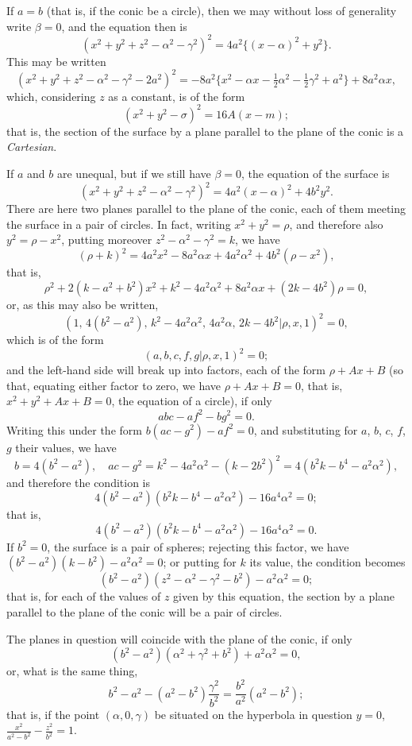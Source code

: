 \documentclass[11pt,a4paper]{article}
\theoremstyle{plain}
\begin{document}
If $a = b$ (that is, if the conic be a circle), then we may without loss of generality write $\beta = 0$, and the equation then is
\[
(x^2 + y^2 + z^2 - \alpha^2 - \gamma^2)^2 = 4a^2\{(x - \alpha)^2 + y^2\}.
\]
This may be written
\[
(x^2 + y^2 + z^2 - \alpha^2 - \gamma^2 - 2a^2)^2 = -8a^2\{x^2 - \alpha x - \tfrac12\alpha^2 - \tfrac12\gamma^2 + a^2\} + 8a^2\alpha x,
\]
which, considering $z$ as a constant, is of the form
\[
(x^2 + y^2 - \sigma)^2 = 16A(x - m);
\]
that is, the section of the surface by a plane parallel to the plane of the conic is a \textit{Cartesian}.

If $a$ and $b$ are unequal, but if we still have $\beta = 0$, the equation of the surface is
\[
(x^2 + y^2 + z^2 - \alpha^2 - \gamma^2)^2 = 4a^2(x - \alpha)^2 + 4b^2y^2.
\]
There are here two planes parallel to the plane of the conic, each of them meeting the surface in a pair of circles. In fact, writing $x^2 + y^2 = \rho$, and therefore also $y^2 = \rho - x^2$, putting moreover $z^2 - \alpha^2 - \gamma^2 = k$, we have
\[
(\rho + k)^2 = 4a^2x^2 - 8a^2\alpha x + 4a^2\alpha^2 + 4b^2(\rho - x^2),
\]
that is,
\[
\rho^2 + 2(k - a^2 + b^2)x^2 + k^2 - 4a^2\alpha^2 + 8a^2\alpha x + (2k - 4b^2)\rho = 0,
\]
or, as this may also be written,
\[
(1, \, 4(b^2 - a^2), \, k^2 - 4a^2\alpha^2, \, 4a^2\alpha, \, 2k - 4b^2  |  \rho, x, 1)^2 = 0,
\]
which is of the form
\[
(a, b, c, f, g  |  \rho, x, 1)^2 = 0;
\]
and the left-hand side will break up into factors, each of the form $\rho + Ax + B$ (so that, equating either factor to zero, we have $\rho + Ax + B = 0$, that is, $x^2 + y^2 + Ax + B = 0$, the equation of a circle), if only
\[
abc - af^2 - bg^2 = 0.
\]
Writing this under the form $b(ac - g^2) - af^2 = 0$, and substituting for $a$, $b$, $c$, $f$, $g$ their values, we have
\[
b = 4(b^2 - a^2), \quad ac - g^2 = k^2 - 4a^2\alpha^2 - (k - 2b^2)^2 = 4(b^2k - b^4 - a^2\alpha^2),
\]
and therefore the condition is
\[
4(b^2 - a^2)(b^2k - b^4 - a^2\alpha^2) - 16a^4\alpha^2 = 0;
\]
that is,
\[
4(b^2 - a^2)(b^2k - b^4 - a^2\alpha^2) - 16a^4\alpha^2 = 0.
\]
If $b^2 = 0$, the surface is a pair of spheres; rejecting this factor, we have $(b^2 - a^2)(k - b^2) - a^2\alpha^2 = 0$; or putting for $k$ its value, the condition becomes
\[
(b^2 - a^2)(z^2 - \alpha^2 - \gamma^2 - b^2) - a^2\alpha^2 = 0;
\]
that is, for each of the values of $z$ given by this equation, the section by a plane parallel to the plane of the conic will be a pair of circles.

The planes in question will coincide with the plane of the conic, if only
\[
(b^2 - a^2)(\alpha^2 + \gamma^2 + b^2) + a^2\alpha^2 = 0,
\]
or, what is the same thing,
\[
b^2 - a^2 - (a^2 - b^2)\frac{\gamma^2}{b^2} = \frac{b^2}{a^2}(a^2 - b^2);
\]
that is, if the point $(\alpha, 0, \gamma)$ be situated on the hyperbola in question $y = 0$, $\frac{x^2}{a^2 - b^2} - \frac{z^2}{b^2} = 1$.
\end{document}
